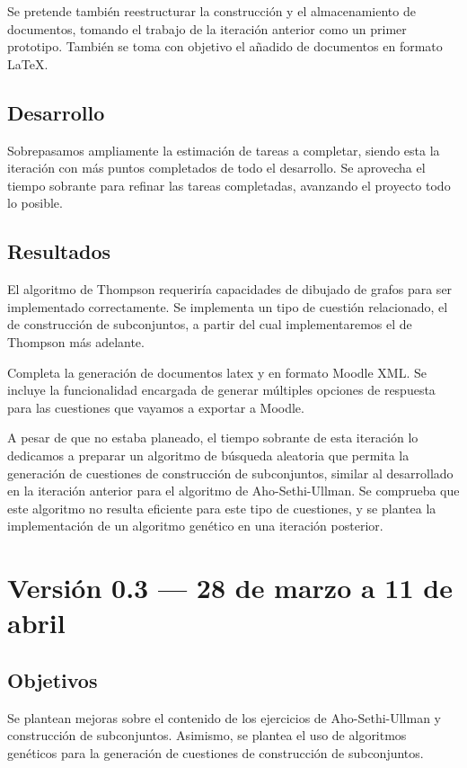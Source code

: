Se pretende también reestructurar la construcción y el almacenamiento de documentos, tomando el trabajo de la iteración anterior como un primer prototipo.
También se toma con objetivo el añadido de documentos en formato \LaTeX{}.

\subsection{Desarrollo}
Sobrepasamos ampliamente la estimación de tareas a completar, siendo esta la iteración con más puntos completados de todo el desarrollo.
Se aprovecha el tiempo sobrante para refinar las tareas completadas, avanzando el proyecto todo lo posible.


\subsection{Resultados}
El algoritmo de Thompson requeriría capacidades de dibujado de grafos para ser implementado correctamente.
Se implementa un tipo de cuestión relacionado, el de construcción de subconjuntos, a partir del cual implementaremos el de Thompson más adelante.

Completa la generación de documentos latex y en formato Moodle XML.
Se incluye la funcionalidad encargada de generar múltiples opciones de respuesta para las cuestiones que vayamos a exportar a Moodle.

A pesar de que no estaba planeado, el tiempo sobrante de esta iteración lo dedicamos a preparar un algoritmo de búsqueda aleatoria que permita la generación de cuestiones de construcción de subconjuntos, similar al desarrollado en la iteración anterior para el algoritmo de Aho-Sethi-Ullman.
Se comprueba que este algoritmo no resulta eficiente para este tipo de cuestiones, y se plantea la implementación de un algoritmo genético en una iteración posterior.

\section{Versión 0.3 --- 28 de marzo a 11 de abril}
\subsection{Objetivos}
Se plantean mejoras sobre el contenido de los ejercicios de Aho-Sethi-Ullman y construcción de subconjuntos.
Asimismo, se plantea el uso de algoritmos genéticos para la generación de cuestiones de construcción de subconjuntos.

